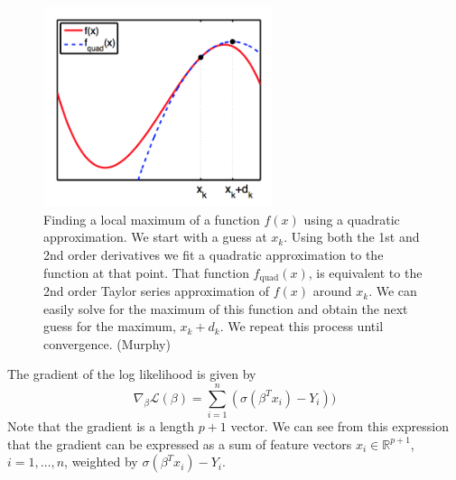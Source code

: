 \documentclass[a4paper]{article}
\begin{document}
\begin{figure}
\centering
\includegraphics[width=0.6\textwidth]{newton_noncvx.png}
\caption{Finding a local maximum of a function $f(x)$ using a quadratic approximation.  We start with a guess at $x_k$.  Using both the 1st and 2nd order derivatives we fit a quadratic approximation to the function at that point.  That function $f_{\text{quad}}(x)$, is equivalent to the 2nd order Taylor series approximation of $f(x)$ around $x_k$.  We can easily solve for the maximum of this function and obtain the next guess for the maximum, $x_k+d_k$. We repeat this process until convergence. (Murphy)}
\label{fig:newton2}
\end{figure}


The gradient of the log likelihood is given by
\begin{equation}
\nabla_\beta\mathcal{L}(\beta) = \sum_{i=1}^{n}(\sigma (\beta^T x_i)-Y_i))
\label{eqn:llgrad}
	\end{equation}
Note that the gradient is a length $p+1$ vector.  We can see from this expression that the gradient can be expressed as a sum of feature vectors $x_i\in\mathbb{R}^{p+1}$, $i=1,\ldots,n$, weighted by $\sigma (\beta^T x_i)-Y_i$.
\end{document}
